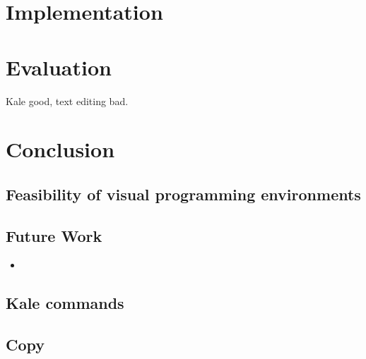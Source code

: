 \documentclass[11pt]{report}
\begin{document}
\chapter{Implementation}

\chapter{Evaluation}

Kale good, text editing bad.

\chapter{Conclusion}

\section{Feasibility of visual programming environments}

\section{Future Work}

\begin{itemize}
	\item 
\end{itemize}

\endgroup %
\clearpage
\renewcommand*{\bibfont}{\raggedright} %


\begin{appendices}
\chapter{Kale commands}

\section{Copy}


\end{appendices}
\end{document}
